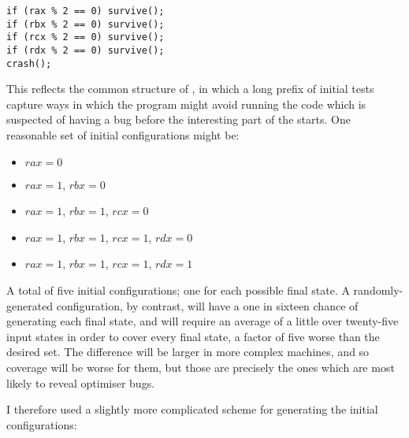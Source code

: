 \begin{verbatim}
if (rax % 2 == 0) survive();
if (rbx % 2 == 0) survive();
if (rcx % 2 == 0) survive();
if (rdx % 2 == 0) survive();
crash();
\end{verbatim}

This reflects the common structure of \StateMachines, in which a long
prefix of initial tests capture ways in which the program might avoid
running the code which is suspected of having a bug before the
interesting part of the \StateMachine starts.  One reasonable set of
initial configurations might be:

\begin{itemize}
\item $rax = 0$
\item $rax = 1$, $rbx = 0$
\item $rax = 1$, $rbx = 1$, $rcx = 0$
\item $rax = 1$, $rbx = 1$, $rcx = 1$, $rdx = 0$
\item $rax = 1$, $rbx = 1$, $rcx = 1$, $rdx = 1$
\end{itemize}

A total of five initial configurations; one for each possible final
state.  A randomly-generated configuration, by contrast, will have a
one in sixteen chance of generating each final state, and will require
an average of a little over twenty-five input states in order to cover
every final state, a factor of five worse than the desired
set.  The difference will be larger in
more complex machines, and so coverage will be worse for them, but
those are precisely the ones which are most likely to reveal optimiser
bugs.

I therefore used a slightly more complicated scheme for generating the
initial configurations:

